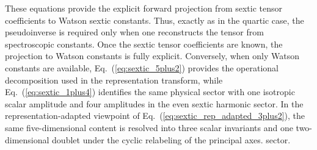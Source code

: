 These equations provide the explicit forward projection from sextic tensor
coefficients to Watson sextic constants.  Thus, exactly as in the quartic case,
the pseudoinverse is required only when one reconstructs the tensor from
spectroscopic constants.  Once the sextic tensor coefficients are known, the
projection to Watson constants is fully explicit.  Conversely, when only Watson
constants are available, Eq.~(\ref{eq:sextic_5plus2}) provides the operational
decomposition used in the representation transform, while
Eq.~(\ref{eq:sextic_1plus4}) identifies the same physical sector with one
isotropic scalar amplitude and four amplitudes in the even sextic harmonic
sector.  In the representation-adapted viewpoint of
Eq.~(\ref{eq:sextic_rep_adapted_3plus2}), the same five-dimensional content is
resolved into three scalar invariants and one two-dimensional doublet under the
cyclic relabeling of the principal axes.
sector.
